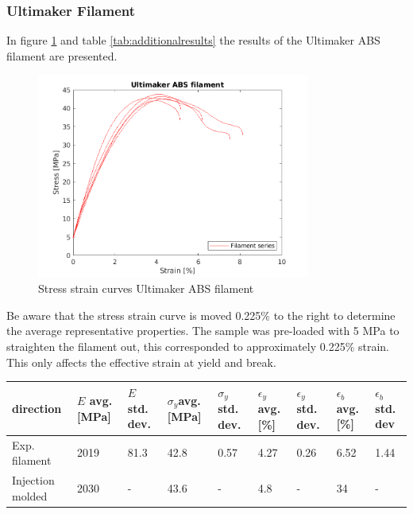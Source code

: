 \subsubsection{Ultimaker Filament}
In figure \ref{fig:filamentresults} and table \ref{tab:additionalresults} the results of the Ultimaker ABS filament are presented.
\begin{figure}[H]
    \centering
    \includegraphics[width=0.80\textwidth]{chapter_5_Experimentaltesting/figures/filamentdata.png}
    \caption{Stress strain curves Ultimaker ABS filament}
    \label{fig:filamentresults}
\end{figure}
Be aware that the stress strain curve is moved 0.225\% to the right to determine the average representative properties. The sample was pre-loaded with 5 MPa to straighten the filament out, this corresponded to approximately 0.225\% strain. This only affects the effective strain at yield and break.

\begin{tabular}{ |p{1.5cm}||p{1cm}|p{1cm}|p{1cm}|p{1cm}|p{1cm}|p{1cm}|p{1cm}|p{1cm}|  }
 \hline
direction & $E$ avg. [MPa] & $E$ std. dev. & $\sigma_y$avg. [MPa] & $\sigma_y$ std. dev. & $\epsilon_y$ avg. [\%] & $\epsilon_y$   std. dev. & $\epsilon_b$ avg. [\%] & $\epsilon_b$   std. dev \\
 \hline
Exp. filament & 2019 & 81.3 & 42.8 & 0.57 & 4.27 & 0.26 & 6.52 & 1.44\\
Injection molded \cite{TechnicalUM} & 2030 & - & 43.6 & - & 4.8 & - & 34 & -\\
 \hline
\end{tabular}
     \label{tab:additionalresults}

